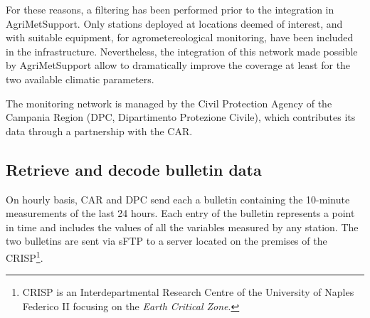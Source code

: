 \documentclass[authoryear,preprint,review,12pt]{elsarticle}
\begin{document}
For these reasons, a filtering has been performed prior to the integration in AgriMetSupport.
Only stations deployed at locations deemed of interest, and with suitable equipment, for agrometereological monitoring, have been included in the infrastructure.
Nevertheless, the integration of this network made possible by AgriMetSupport allow to dramatically improve the coverage at least for the two available climatic parameters.

The monitoring network is managed by the Civil Protection Agency of the Campania Region (DPC, Dipartimento Protezione Civile), which contributes its data through a partnership with the CAR.

\subsection{Retrieve and decode bulletin data}
On hourly basis, CAR and DPC send each a bulletin containing the 10-minute measurements of the last 24 hours.
Each entry of the bulletin represents a point in time and includes the values of all the variables measured by any station.
The two bulletins are sent via sFTP to a server located on the premises of the CRISP\footnote{CRISP is an Interdepartmental Research Centre of the University of Naples Federico II focusing on the \textit{Earth Critical Zone}.}.

 
\end{document}
